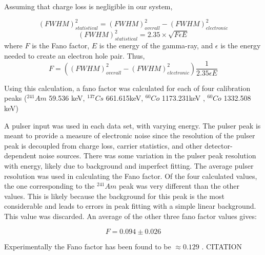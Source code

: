 Assuming that charge loss is negligible in our system,

\begin{equation}
(FWHM)^{2}_{statistical} = (FWHM)^{2}_{overall} - (FWHM)^{2}_{electronic}
\end{equation}
\begin{equation}
(FWHM)^{2}_{statistical} = 2.35 \times \sqrt{F \epsilon E}
\end{equation}
where $F$ is the Fano factor, $E$ is the energy of the gamma-ray, and $\epsilon$ is the energy needed to create an electron hole pair. Thus,
\begin{equation}
F = ((FWHM)^{2}_{overall} - (FWHM)^{2}_{electronic}) \frac{1}{2.35 \epsilon E}
\end{equation}

Using this calculation, a fano factor was calculated for each of four calibration peaks (${}^{241}Am$ 59.536 keV, ${}^{137}Cs$ 661.615keV, ${}^{60}Co$ 1173.231keV , ${}^{60}Co$ 1332.508 keV)
  
A pulser input was used in each data set, with varying energy. The pulser peak is meant to provide a measure of electronic noise since the resolution of the pulser peak is decoupled from charge loss, carrier statistics, and other detector-dependent noise sources. There was some variation in the pulser peak resolution with energy, likely due to background and imperfect fitting. The average pulser resolution was used in calculating the Fano factor. Of the four calculated values, the one corresponding to the ${}^{241}Am$ peak was very different than the other values. This is likely because the background for this peak is the most considerable and leads to errors in peak fitting with a simple linear background. This value was discarded. An average of the other three fano factor values gives:

\begin{equation}
F = 0.094 \pm 0.026
\end{equation}

Experimentally the Fano factor has been found to be $\approx 0.129$  \cite{Knoll}. CITATION